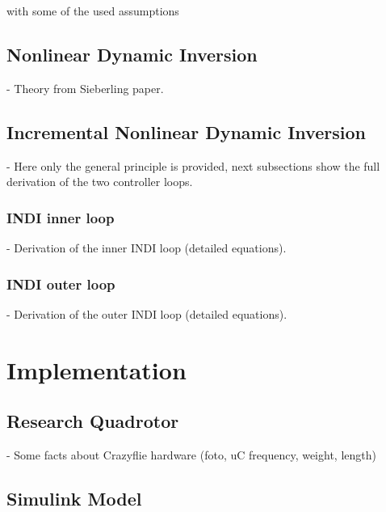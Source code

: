 \documentclass[11pt, a4paper, twoside]{report}
\begin{document}
with some of the used assumptions

\section{Nonlinear Dynamic Inversion} \label{sec:ndi}

- Theory from Sieberling paper.

\section{Incremental Nonlinear Dynamic Inversion} \label{sec:indi}

- Here only the general principle is provided, next subsections show the full derivation of the two controller loops.

\subsection{INDI inner loop} \label{subsec: indi_inner}

- Derivation of the inner INDI loop (detailed equations).

\subsection{INDI outer loop} \label{subsec: indi_outer}

- Derivation of the outer INDI loop (detailed equations).

\thispagestyle{fancy}



\chapter{Implementation} \label{cha:implementation}

\thispagestyle{fancy}

\section{Research Quadrotor} \label{sec:research_quadrotor}

- Some facts about Crazyflie hardware (foto, uC frequency, weight, length)

\section{Simulink Model} \label{sec:simulink_model}
\end{document}
